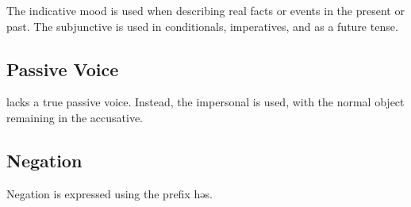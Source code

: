 The indicative mood is used when describing real facts or events in the present
or past. The subjunctive is used in conditionals, imperatives, and as a future
tense.

\subsection{Passive Voice}
\Langname{} lacks a true passive voice. Instead, the impersonal is used, with
the normal object remaining in the accusative.

\subsection{Negation}
Negation is expressed using the prefix {\ll həs}.

